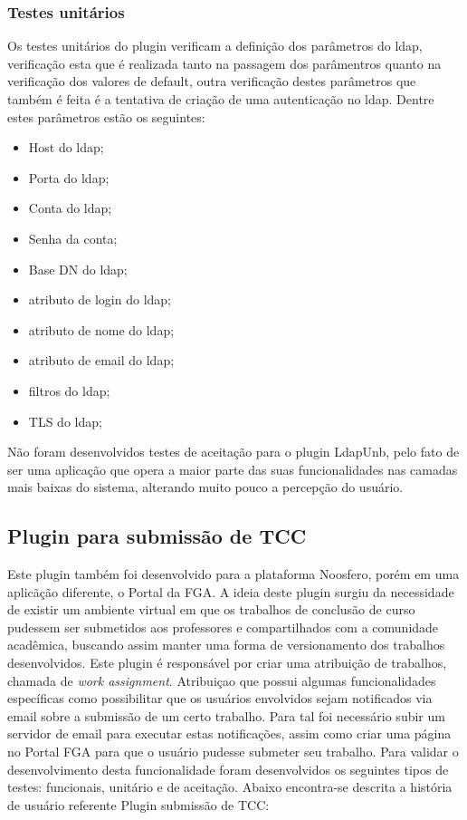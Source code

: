 
\subsubsection{Testes unitários}
%
Os testes unitários do plugin verificam a definição dos parâmetros do ldap, verificação esta que é realizada tanto na passagem dos parâmentros quanto na verificação dos valores de default, outra verificação destes parâmetros que também é feita é a tentativa de criação de uma autenticação no ldap. Dentre estes parâmetros estão os seguintes:

\begin{itemize}
\item Host do ldap;
\item Porta do ldap;
\item Conta do ldap;
\item Senha da conta;
\item Base DN do ldap;
\item atributo de login do ldap;
\item atributo de nome do ldap;
\item atributo de email do ldap;
\item filtros do ldap;
\item TLS do ldap;
\end{itemize}

Não foram desenvolvidos testes de aceitação para o plugin LdapUnb, pelo fato de ser uma aplicação que opera a maior parte das suas funcionalidades nas camadas mais baixas do sistema, alterando muito pouco a percepção do usuário.

\subsection{Plugin para submissão de TCC}

Este plugin também foi desenvolvido para a plataforma Noosfero, porém em uma aplicãção diferente, o Portal da FGA. A ideia deste plugin surgiu da necessidade de existir um ambiente virtual em que os trabalhos de conclusão de curso pudessem ser submetidos aos professores e compartilhados com a comunidade acadêmica, buscando assim manter uma forma de versionamento dos trabalhos desenvolvidos.
%
Este plugin é responsável por criar uma atribuição de trabalhos, chamada de \textit{work assignment}. Atribuiçao que possui algumas funcionalidades específicas como possibilitar que os usuários envolvidos sejam notificados via email sobre a submissão de um certo trabalho. Para tal foi necessário subir um servidor de email para executar estas notificações, assim como criar uma página no Portal FGA para que o usuário pudesse submeter seu trabalho.
%
Para validar o desenvolvimento desta funcionalidade foram desenvolvidos os seguintes tipos de testes: funcionais, unitário e de aceitação. Abaixo encontra-se descrita a história de usuário referente Plugin submissão de TCC:

